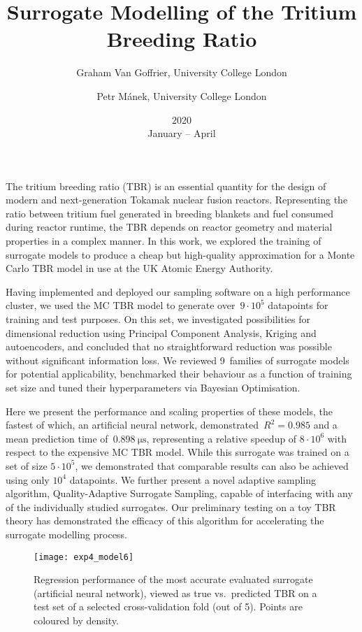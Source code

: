 \documentclass{article}
\title{Surrogate Modelling of the Tritium Breeding Ratio}
\date{2020\\ January -- April}
\author{
	Graham Van Goffrier, University College London\\
	\and Petr Mánek, University College London
}
\begin{document}
\maketitle
\thispagestyle{empty}

The tritium breeding ratio (TBR) is an essential quantity for the design of
modern and next-generation Tokamak nuclear fusion reactors. Representing the
ratio between tritium fuel generated in breeding blankets and fuel consumed
during reactor runtime, the TBR depends on reactor geometry and material
properties in a complex manner. In this work, we explored the
training of surrogate models to produce a cheap but high-quality approximation
for a Monte Carlo TBR model in use at the UK Atomic Energy Authority.

Having implemented and deployed our sampling software on a high performance cluster, we
used the MC TBR model to generate over~$9\cdot 10^5$ datapoints for training and
test purposes. On this set, we investigated possibilities for
dimensional reduction using Principal Component Analysis, Kriging and
autoencoders, and concluded that no straightforward reduction was possible
without significant information loss. We reviewed 9~families of surrogate models for potential
applicability, benchmarked their behaviour as a function of training set size and tuned their
hyperparameters via Bayesian Optimisation.

Here we present the performance and scaling properties of these
models, the fastest of which, an artificial neural network,
demonstrated~$R^2=\num{0.985}$ and a mean
prediction time of~$\SI{0.898}{\micro\second}$, representing a relative speedup of $8\cdot 10^6$
with respect to the expensive MC TBR model. While this surrogate was trained on
a set of size $5\cdot 10^5$, we demonstrated that comparable results can also be
achieved using only $10^4$ datapoints. We further present a novel adaptive
sampling algorithm, Quality-Adaptive Surrogate Sampling, capable
of interfacing with any of the individually studied surrogates. Our preliminary
testing on a toy TBR theory has demonstrated the efficacy of this algorithm for
accelerating the surrogate modelling process.

\begin{figure}[h]
	\centering
	\texttt{[image: exp4\_model6]}
	\caption{Regression performance of the most accurate evaluated surrogate
		(artificial neural network), viewed as true vs.~predicted TBR on a test
		set of a selected cross-validation fold (out of 5). Points are coloured by density.}
\end{figure}
\end{document}
